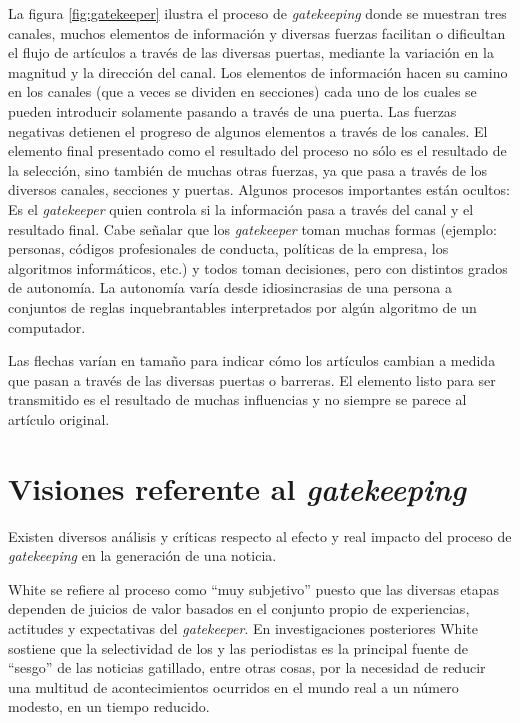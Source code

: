 La figura \ref{fig:gatekeeper} ilustra el proceso de \emph{gatekeeping} donde se muestran tres canales, muchos elementos de información y diversas fuerzas facilitan o dificultan el flujo de artículos a través de las diversas puertas, mediante la variación en la magnitud y la dirección del canal. Los elementos de información hacen su camino en los canales (que a veces se dividen en secciones) cada uno de los cuales se pueden introducir solamente pasando a través de una puerta. Las fuerzas negativas detienen el progreso de algunos elementos a través de los canales. 
El elemento final presentado como el resultado del proceso no sólo es el resultado de la selección, sino también de muchas otras fuerzas, ya que pasa a través de los diversos canales, secciones y puertas. Algunos procesos importantes están ocultos: Es el \emph{gatekeeper} quien controla si la información pasa a través del canal y el resultado final. Cabe señalar que los \emph{gatekeeper} toman muchas formas (ejemplo: personas, códigos profesionales de conducta, políticas de la empresa, los algoritmos informáticos, etc.) y todos toman decisiones, pero con distintos grados de autonomía. La autonomía varía desde idiosincrasias de una persona a conjuntos de reglas inquebrantables interpretados por algún algoritmo de un computador.

Las flechas varían en tamaño para indicar cómo los artículos cambian a medida que pasan a través de las diversas puertas o barreras. El elemento listo para ser transmitido es el resultado de muchas influencias y no siempre se parece al artículo original.

\section{Visiones referente al \emph{gatekeeping}}

Existen diversos análisis y críticas respecto al efecto y real impacto del proceso de \emph{gatekeeping} en la generación de una noticia.

White\cite{white} se refiere al proceso como ``muy subjetivo'' puesto que las diversas etapas dependen de juicios de valor basados en el conjunto propio de experiencias, actitudes y expectativas del \emph{gatekeeper}. En investigaciones posteriores White sostiene que la selectividad de los y las periodistas es la principal fuente de ``sesgo'' de las noticias gatillado, entre otras cosas, por la necesidad de reducir una multitud de acontecimientos ocurridos en el mundo real a un número modesto, en un tiempo reducido. 

